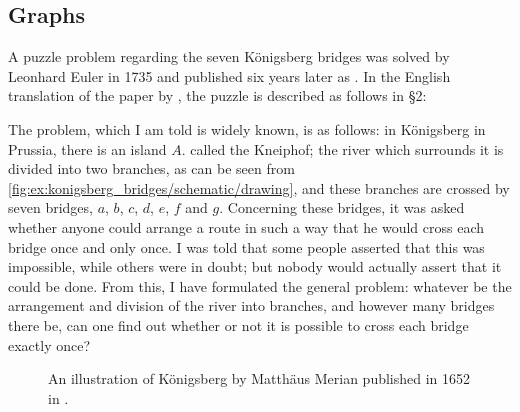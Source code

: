 \subsection{Graphs}\label{subsec:graphs}

\begin{example}\label{ex:konigsberg_bridges}
  A puzzle problem regarding the seven K\"onigsberg bridges was solved by Leonhard Euler in 1735 and published six years later as \cite{Euler1741}. In the English translation of the paper by , the puzzle is described as follows in \S 2:
  \begin{displayquote}
    The problem, which I am told is widely known, is as follows: in K\"onigsberg in Prussia, there is an island \( A \). called the Kneiphof; the river which surrounds it is divided into two branches, as can be seen from \cref{fig:ex:konigsberg_bridges/schematic/drawing}, and these branches are crossed by seven bridges, \( a \), \( b \), \( c \), \( d \), \( e \), \( f \) and \( g \). Concerning these bridges, it was asked whether anyone could arrange a route in such a way that he would cross each bridge once and only once. I was told that some people asserted that this was impossible, while others were in doubt; but nobody would actually assert that it could be done. From this, I have formulated the general problem: whatever be the arrangement and division of the river into branches, and however many bridges there be, can one find out whether or not it is possible to cross each bridge exactly once?
  \end{displayquote}

  \begin{figure}[ht!]
    \caption{An illustration of K\"onigsberg by Matth\"aus Merian published in 1652 in \cite{MerianKönigsbergBridges}.}
    \label{fig:ex:konigsberg_bridges/illustration}
  \end{figure}


\end{example}
